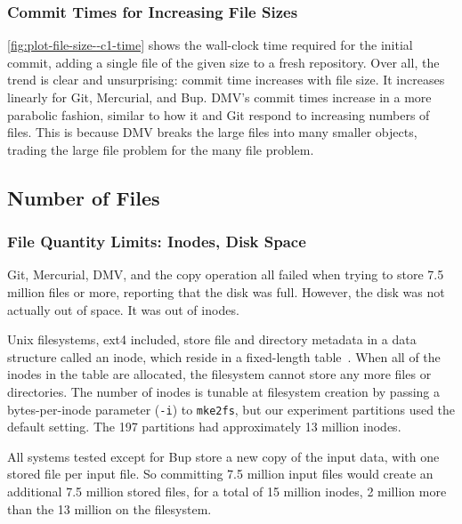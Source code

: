 %

\subsubsection{Commit Times for Increasing File Sizes}

\autoref{fig:plot-file-size--c1-time} shows the wall-clock time required for the initial \gls{commit}, adding a single file of the given size to a fresh \gls{repository}.
Over all, the trend is clear and unsurprising: \gls{commit} time increases with file size.
It increases linearly for Git, Mercurial, and Bup.
DMV's commit times increase in a more parabolic fashion,
similar to how it and Git respond to increasing numbers of files.
This is because DMV breaks the large files into many smaller objects, trading the large file problem for the many file problem.


%



\subsection{Number of Files}

\subsubsection{File Quantity Limits: Inodes, Disk Space}

Git, Mercurial, DMV, and the copy operation all failed when trying to store \num{7.5} million files or more, reporting that the disk was full.
However, the disk was not actually out of space.
It was out of \glspl{inode}.

Unix filesystems, ext4 included, store file and directory metadata in a data structure called an \gls{inode}, which reside in a fixed-length table~\cite{unix_timesharing_system}.
When all of the \glspl{inode} in the table are allocated, the filesystem cannot store any more files or directories.
The number of inodes is tunable at filesystem creation by passing a bytes-per-inode parameter (\lstinline{-i}) to \lstinline{mke2fs}, but our experiment partitions used the default setting.
The \SI{197}{\gib} partitions had approximately \num{13} million inodes.

All systems tested except for Bup store a new copy of the input data, with one stored file per input file.
So committing \num{7.5} million input files would create an additional \num{7.5} million stored files, for a total of \num{15} million inodes, \num{2} million more than the \num{13} million on the filesystem.

